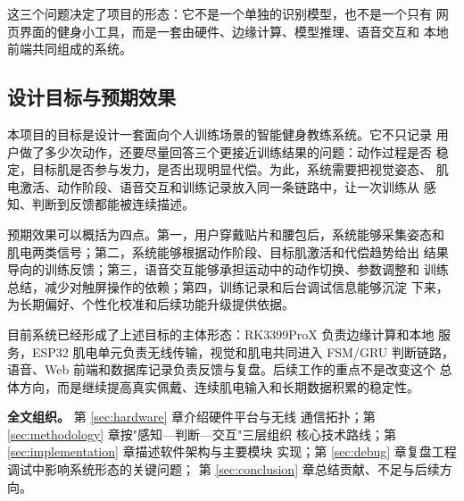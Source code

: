 这三个问题决定了项目的形态：它不是一个单独的识别模型，也不是一个只有
网页界面的健身小工具，而是一套由硬件、边缘计算、模型推理、语音交互和
本地前端共同组成的系统。

\subsection{设计目标与预期效果}

本项目的目标是设计一套面向个人训练场景的智能健身教练系统。它不只记录
用户做了多少次动作，还要尽量回答三个更接近训练结果的问题：动作过程是否
稳定，目标肌是否参与发力，是否出现明显代偿。为此，系统需要把视觉姿态、
肌电激活、动作阶段、语音交互和训练记录放入同一条链路中，让一次训练从
感知、判断到反馈都能被连续描述。

预期效果可以概括为四点。第一，用户穿戴贴片和腰包后，系统能够采集姿态和
肌电两类信号；第二，系统能够根据动作阶段、目标肌激活和代偿趋势给出
结果导向的训练反馈；第三，语音交互能够承担运动中的动作切换、参数调整和
训练总结，减少对触屏操作的依赖；第四，训练记录和后台调试信息能够沉淀
下来，为长期偏好、个性化校准和后续功能升级提供依据。

目前系统已经形成了上述目标的主体形态：RK3399ProX 负责边缘计算和本地
服务，ESP32 肌电单元负责无线传输，视觉和肌电共同进入 FSM/GRU 判断链路，
语音、Web 前端和数据库记录负责反馈与复盘。后续工作的重点不是改变这个
总体方向，而是继续提高真实佩戴、连续肌电输入和长期数据积累的稳定性。

\smallskip
\noindent\textbf{全文组织。} 第 \ref{sec:hardware} 章介绍硬件平台与无线
通信拓扑；第 \ref{sec:methodology} 章按"感知—判断—交互"三层组织
核心技术路线；第 \ref{sec:implementation} 章描述软件架构与主要模块
实现；第 \ref{sec:debug} 章复盘工程调试中影响系统形态的关键问题；
第 \ref{sec:conclusion} 章总结贡献、不足与后续方向。
